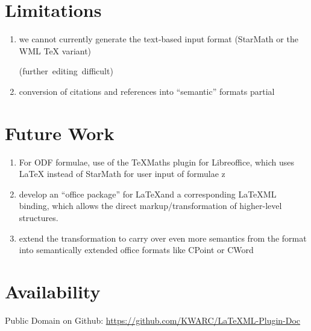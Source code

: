 \documentclass[a0,landscape]{a0poster}
\def\latexml{{\LaTeX}ML\xspace}
\def\lec#1{\strut\hfil\strut\null\nobreak\hfill\hbox{(#1)}\par}
\begin{document}
\begin{multicols}{3}
\section*{Limitations}
\begin{enumerate}
\item we cannot currently generate the text-based input format (StarMath or the WML {\TeX}
  variant)\lec{further editing difficult}
\item conversion of citations and references into ``semantic'' formats partial
\end{enumerate}

\section*{Future Work}
\begin{enumerate}
\item For ODF formulae, use of the TeXMaths plugin for Libreoffice, which uses {\LaTeX}
  instead of StarMath for user input of formulae
z\item develop an ``office package'' for \LaTeX and a corresponding \latexml binding, which
  allows the direct markup/transformation of higher-level structures.
\item extend the transformation to carry over even more semantics from the \stex format
  into semantically extended office formats like CPoint or CWord
\end{enumerate}

\section*{Availability}
Public Domain on Github: \url{https://github.com/KWARC/LaTeXML-Plugin-Doc}
\end{multicols}
\end{document}
